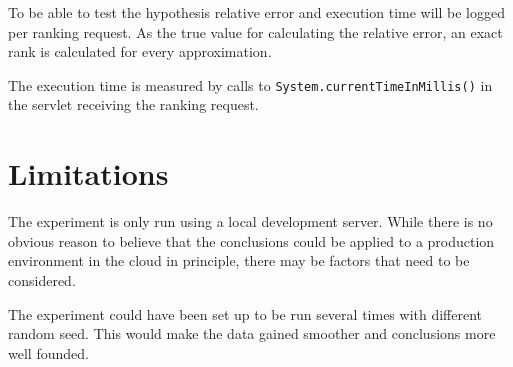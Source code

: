 To be able to test the hypothesis relative error and execution time will be logged per ranking request. As the true value for calculating the relative error, an exact rank is calculated for every approximation.

The execution time is measured by calls to \texttt{System.currentTimeInMillis()} in the servlet receiving the ranking request.


\section{Limitations}

The experiment is only run using a local development server. While there is no obvious reason to believe that the conclusions could be applied to a production environment in the cloud in principle, there may be factors that need to be considered. 

The experiment could have been set up to be run several times with different random seed. This would make the data gained smoother and conclusions more well founded. 
